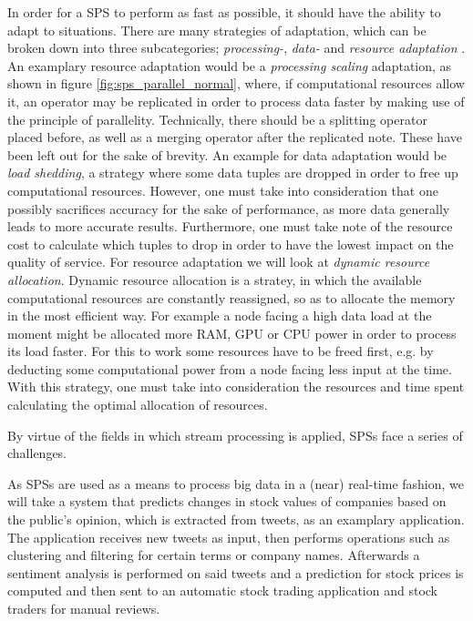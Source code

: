         \quad In order for a SPS to perform as fast as possible, it should have the ability to adapt to situations.
        There are many strategies of adaptation, which can be broken down into three subcategories; \textit{processing-}, \textit{data-} and 
        \textit{resource adaptation} \cite[p.8 f.]{QIN20191}. 
        An examplary resource adaptation would be a \textit{processing scaling} adaptation, as shown in figure \ref{fig:sps_parallel_normal}, 
        where, if computational resources allow it, an operator may be replicated in order to process data faster by
        making use of the principle of parallelity. Technically, there should be a splitting operator placed before, 
        as well as a merging operator after the replicated note. These have been left out for the sake of brevity.
        An example for data adaptation would be \textit{load shedding}, a strategy where some data tuples are dropped in order to free up computational resources.
        However, one must take into consideration that one possibly sacrifices accuracy for the sake of performance, as more data generally leads to more accurate results.
        Furthermore, one must take note of the resource cost to calculate which tuples to drop in order to have the lowest impact on the quality of service.
        For resource adaptation we will look at \textit{dynamic resource allocation}. Dynamic resource allocation is a stratey, in which the available computational 
        resources are constantly reassigned, so as to allocate the memory in the most efficient way. For example a node facing a high data load at the moment might 
        be allocated more RAM, GPU or CPU power in order to process its load faster. For this to work some resources have to be freed first, e.g. by deducting some
        computational power from a node facing less input at the time. With this strategy, one must take into consideration the resources and time spent calculating 
        the optimal allocation of resources.

        \quad By virtue of the fields in which stream processing is applied, SPSs face a series of challenges.
        
        \quad As SPSs are used as a means to process big data in a (near) real-time fashion, we will take a system that predicts changes in stock values 
        of companies based on the public's opinion, which is extracted from tweets, as an examplary application.
        The application receives new \gls{tweet}s as input, then performs operations such as clustering and filtering for certain terms or company names. 
        Afterwards a sentiment analysis is performed on said tweets and a prediction for stock prices is computed and then sent 
        to an automatic stock trading application and stock traders for manual reviews.


